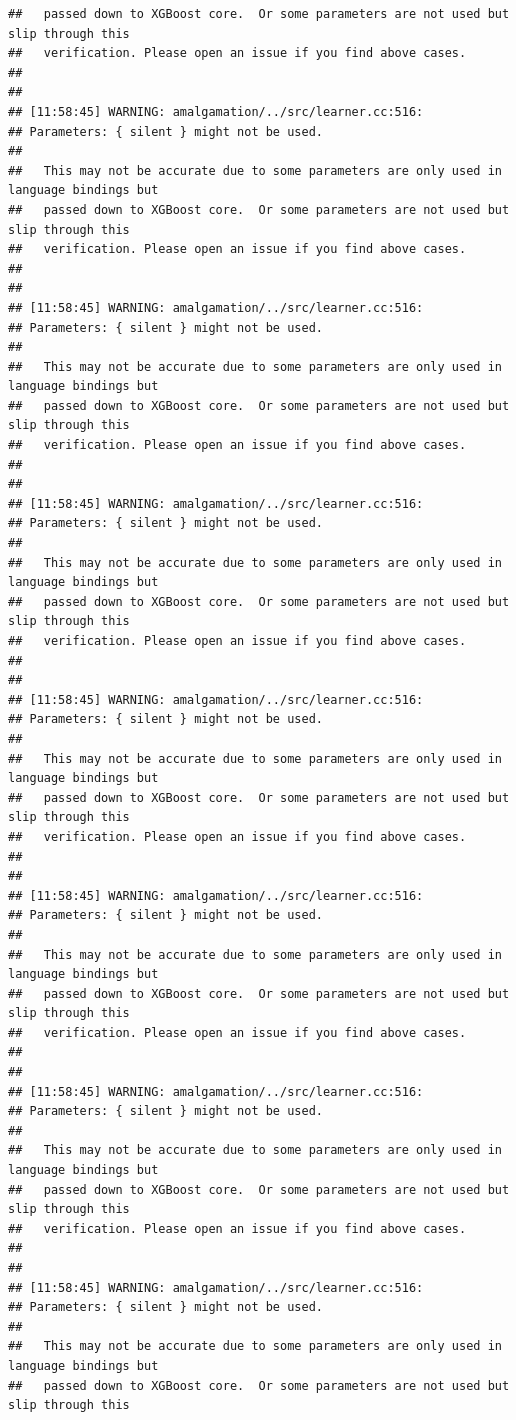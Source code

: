 \documentclass[AMS,STIX2COL]{WileyNJD-v2}\usepackage[]{graphicx}\usepackage[]{color}
\makeatletter
\newenvironment{kframe}{%
 \def\at@end@of@kframe{}%
 \ifinner\ifhmode%
  \def\at@end@of@kframe{\end{minipage}}%
  \begin{minipage}{\columnwidth}%
 \fi\fi%
 \def\FrameCommand##1{\hskip\@totalleftmargin \hskip-\fboxsep
 \colorbox{shadecolor}{##1}\hskip-\fboxsep
     \hskip-\linewidth \hskip-\@totalleftmargin \hskip\columnwidth}%
 \MakeFramed {\advance\hsize-\width
   \@totalleftmargin\z@ \linewidth\hsize
   \@setminipage}}%
 {\par\unskip\endMakeFramed%
 \at@end@of@kframe}
\newenvironment{knitrout}{}{} %
\makeatother
\begin{document}
\begin{knitrout}
\begin{kframe}
\begin{verbatim}
##   passed down to XGBoost core.  Or some parameters are not used but slip through this
##   verification. Please open an issue if you find above cases.
## 
## 
## [11:58:45] WARNING: amalgamation/../src/learner.cc:516: 
## Parameters: { silent } might not be used.
## 
##   This may not be accurate due to some parameters are only used in language bindings but
##   passed down to XGBoost core.  Or some parameters are not used but slip through this
##   verification. Please open an issue if you find above cases.
## 
## 
## [11:58:45] WARNING: amalgamation/../src/learner.cc:516: 
## Parameters: { silent } might not be used.
## 
##   This may not be accurate due to some parameters are only used in language bindings but
##   passed down to XGBoost core.  Or some parameters are not used but slip through this
##   verification. Please open an issue if you find above cases.
## 
## 
## [11:58:45] WARNING: amalgamation/../src/learner.cc:516: 
## Parameters: { silent } might not be used.
## 
##   This may not be accurate due to some parameters are only used in language bindings but
##   passed down to XGBoost core.  Or some parameters are not used but slip through this
##   verification. Please open an issue if you find above cases.
## 
## 
## [11:58:45] WARNING: amalgamation/../src/learner.cc:516: 
## Parameters: { silent } might not be used.
## 
##   This may not be accurate due to some parameters are only used in language bindings but
##   passed down to XGBoost core.  Or some parameters are not used but slip through this
##   verification. Please open an issue if you find above cases.
## 
## 
## [11:58:45] WARNING: amalgamation/../src/learner.cc:516: 
## Parameters: { silent } might not be used.
## 
##   This may not be accurate due to some parameters are only used in language bindings but
##   passed down to XGBoost core.  Or some parameters are not used but slip through this
##   verification. Please open an issue if you find above cases.
## 
## 
## [11:58:45] WARNING: amalgamation/../src/learner.cc:516: 
## Parameters: { silent } might not be used.
## 
##   This may not be accurate due to some parameters are only used in language bindings but
##   passed down to XGBoost core.  Or some parameters are not used but slip through this
##   verification. Please open an issue if you find above cases.
## 
## 
## [11:58:45] WARNING: amalgamation/../src/learner.cc:516: 
## Parameters: { silent } might not be used.
## 
##   This may not be accurate due to some parameters are only used in language bindings but
##   passed down to XGBoost core.  Or some parameters are not used but slip through this

\end{verbatim}
\end{kframe}
\end{knitrout}
\end{document}
